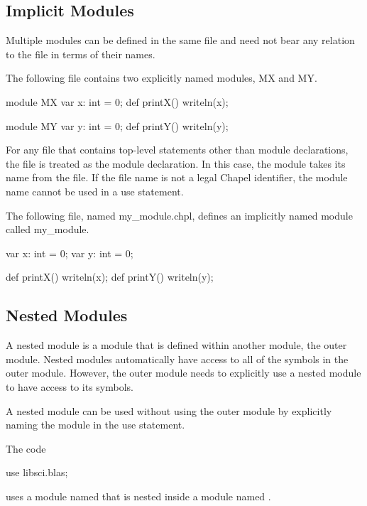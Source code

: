 \subsection{Implicit Modules}
\label{Implicit_Modules}

Multiple modules can be defined in the same file and need not bear any
relation to the file in terms of their names.

\begin{example}
The following file contains two explicitly named modules, MX and MY.
\begin{chapelcode}
module MX {
  var x: int = 0;
  def printX() {
    writeln(x);
  }
}

module MY {
  var y: int = 0;
  def printY() {
    writeln(y);
  }
}
\end{chapelcode}
\end{example}

For any file that contains top-level statements other than module
declarations, the file is treated as the module declaration.  In this
case, the module takes its name from the file.  If the file name is
not a legal Chapel identifier, the module name cannot be used in a use
statement.


\begin{example}
The following file, named my\_module.chpl, defines an implicitly named
module called my\_module.
\begin{chapelcode}
var x: int = 0;
var y: int = 0;

def printX() {
  writeln(x);
}
def printY() {
  writeln(y);
}
\end{chapelcode}
\end{example}


\subsection{Nested Modules}
\label{Nested_Modules}

A nested module is a module that is defined within another module, the
outer module.  Nested modules automatically have access to all of the
symbols in the outer module.  However, the outer module needs to
explicitly use a nested module to have access to its symbols.

A nested module can be used without using the outer module by
explicitly naming the module in the use statement.
\begin{example}
The code
\begin{chapel}
use libsci.blas;
\end{chapel}
uses a module named  that is nested inside a module
named .
\end{example}

